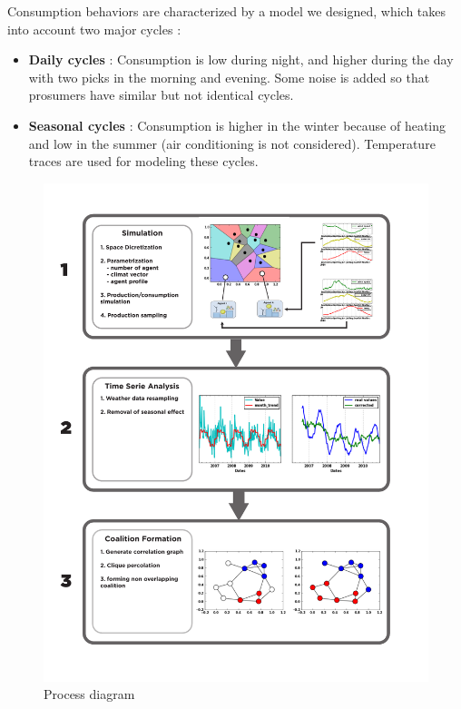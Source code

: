 \documentclass[conference]{IEEEtran}
\begin{document}
Consumption behaviors are characterized by a model we designed, which takes into account two major cycles : 

\begin{itemize}
\item \textbf{Daily cycles} : Consumption is low during night, and higher during the day with two picks in the morning and evening. Some noise is added so that prosumers have similar but not identical cycles.
\item \textbf{Seasonal cycles} : Consumption is higher in the winter because of heating and low in the summer (air conditioning is not considered). Temperature traces are used for modeling these cycles.
\end{itemize} 

\begin{center}
\begin{figure}
\includegraphics[scale=0.37]{figure2/Fig2}
\caption{Process diagram}
\label{Fig1}
\end{figure}
\end{center}
\end{document}
